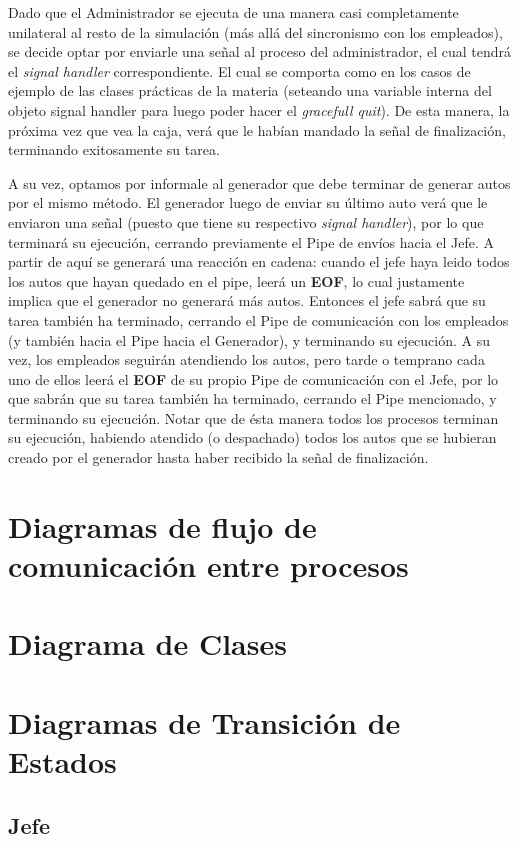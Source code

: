 \documentclass[a4paper,12pt]{article}
\begin{document}
Dado que el Administrador se ejecuta de una manera casi completamente unilateral al resto de la simulación (más allá del sincronismo con los empleados), se decide optar por enviarle una señal al proceso del administrador, el cual tendrá el \textit{signal handler} correspondiente. El cual se comporta como en los casos de ejemplo de las clases prácticas de la materia (seteando una variable interna del objeto signal handler para luego poder hacer el \textit{gracefull quit}). De esta manera, la próxima vez que vea la caja, verá que le habían mandado la señal de finalización, terminando exitosamente su tarea.

A su vez, optamos por informale al generador que debe terminar de generar autos por el mismo método. El generador luego de enviar su último auto verá que le enviaron una señal (puesto que tiene su respectivo \textit{signal handler}), por lo que terminará su ejecución, cerrando previamente el Pipe de envíos hacia el Jefe. A partir de aquí se generará una reacción en cadena: cuando el jefe haya leido todos los autos que hayan quedado en el pipe, leerá un \textbf{EOF}, lo cual justamente implica que el generador no generará más autos. Entonces el jefe sabrá que su tarea también ha terminado, cerrando el Pipe de comunicación con los empleados (y también hacia el Pipe hacia el Generador), y terminando su ejecución. A su vez, los empleados seguirán atendiendo los autos, pero tarde o temprano cada uno de ellos leerá el \textbf{EOF} de su propio Pipe de comunicación con el Jefe, por lo que sabrán que su tarea también ha terminado, cerrando el Pipe mencionado, y terminando su ejecución. Notar que de ésta manera todos los procesos terminan su ejecución, habiendo atendido (o despachado) todos los autos que se hubieran creado por el generador hasta haber recibido la señal de finalización.

\section{Diagramas de flujo de comunicación entre procesos}

\section{Diagrama de Clases}

\section{Diagramas de Transición de Estados}
\subsection{Jefe}
\end{document}
